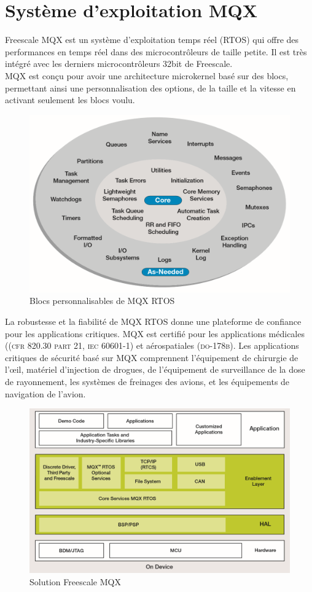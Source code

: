 \documentclass[11pt, a4paper, twoside]{book}
\begin{document}
{\section{Système d'exploitation MQX}
Freescale MQX est un système d'exploitation temps réel (RTOS) qui offre des performances en temps réel dans des microcontrôleurs de taille petite. Il est très intégré avec les derniers microcontrôleurs 32bit de Freescale.\\

MQX est conçu pour avoir une architecture microkernel basé sur des blocs, permettant ainsi une personnalisation des options, de la taille et la vitesse en activant seulement les blocs voulu.
\begin{figure}[H]
\centering
\includegraphics[width=\textwidth]{mqxBlocs}
\caption{Blocs personnalisables de MQX RTOS}
\end{figure}
La robustesse et la fiabilité de MQX RTOS donne une plateforme de confiance pour les applications critiques. MQX est certifié pour les applications médicales (\textsc{(cfr 820.30 part 21, iec 60601-1)} et aérospatiales \textsc{(do-178b)}. Les applications critiques de sécurité basé sur MQX comprennent l'équipement de chirurgie de l'œil, matériel d'injection de drogues, de l'équipement de surveillance de la dose de rayonnement, les systèmes de freinages des avions, et les équipements de navigation de l'avion.
\begin{figure}[H]
\centering
\includegraphics[width=\textwidth]{mqx}
\caption{Solution Freescale MQX}
\end{figure}
}
\end{document}
